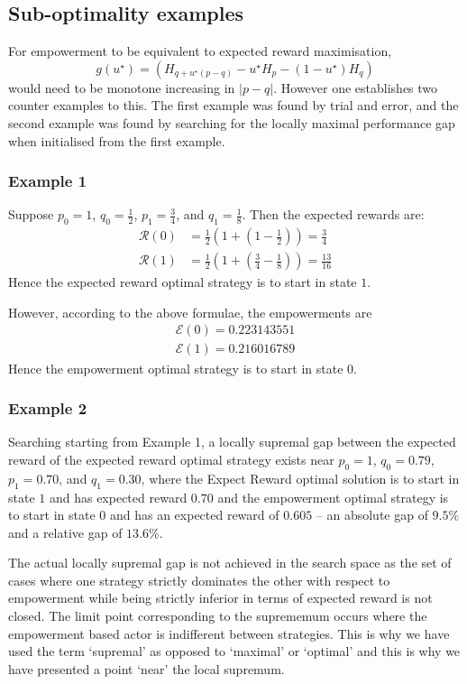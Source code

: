 \documentclass{article}
\newcommand{\Ee}{\mathcal{E}}
\newcommand{\Rr}{\mathcal{R}}
\begin{document}
\subsection{Sub-optimality examples}
For empowerment to be equivalent to expected reward maximisation, 
\[g(u^\star)=\left(H_{q+u^\star(p-q)}-u^\star H_{p}-(1-u^\star)H_{q}\right)\] 
would need to be monotone increasing in $|p-q|$. However one establishes two counter examples to this. The first example was found by trial and error, and the second example was found by searching for the locally maximal performance gap when initialised from the first example. 

\subsubsection{Example 1}
Suppose $p_0=1$, $q_0=\frac{1}{2}$, $p_1=\frac{3}{4}$, and $q_1 = \frac{1}{8}$. Then the expected rewards are:
\begin{align*}
\Rr(0) &= \frac{1}{2}\left(1+\left(1-\frac{1}{2}\right)\right)=\frac{3}{4}\\
\Rr(1) &= \frac{1}{2}\left(1+\left(\frac{3}{4}-\frac{1}{8}\right)\right)=\frac{13}{16}
\end{align*}
Hence the expected reward optimal strategy is to start in state $1$.

However, according to the above formulae, the empowerments are
\begin{align*}
\Ee(0)=0.223143551\\
\Ee(1)=0.216016789 
\end{align*}
Hence the empowerment optimal strategy is to start in state $0$.

\subsubsection{Example 2}
Searching starting from Example 1, a locally supremal gap between the expected reward of the expected reward optimal strategy exists near $p_0=1$, $q_0=0.79$, $p_1=0.70$, and $q_1 = 0.30$, where the Expect Reward optimal solution is to start in state $1$ and has expected reward $0.70$ and the empowerment optimal strategy is to start in state $0$ and has an expected reward of $0.605$ -- an absolute gap of $9.5\%$ and a relative gap of $13.6\%$. 

The actual locally supremal gap is not achieved in the search space as the set of cases where one strategy strictly dominates the other with respect to empowerment while being strictly inferior in terms of expected reward is not closed. The limit point corresponding to the suprememum occurs where the empowerment based actor is indifferent between strategies. This is why we have used the term `supremal' as opposed to `maximal' or `optimal' and this is why we have presented a point `near' the local supremum.
\end{document}
